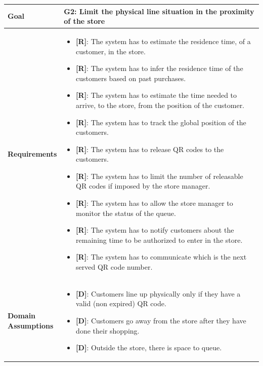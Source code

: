 \begin{table}[H]
\centering
\begin{tabular}{| m{} | m{} |} 
	\hline
	\textbf{Goal} &
		\textbf{G2: Limit the physical line situation in the proximity of the store} \\
	\hline
	\textbf{Requirements} &
		\begin{itemize}
			\item {\textbf{[R]}}: The system has to estimate the residence time, of a customer, in the store.
			\item {\textbf{[R]}}: The system has to infer the residence time of the customers based on past purchases.
			\item {\textbf{[R]}}: The system has to estimate the time needed to arrive, to the store, from the position of the customer.
			\item {\textbf{[R]}}: The system has to track the global position of the customers.
			\item {\textbf{[R]}}: The system has to release QR codes to the customers.
			\item {\textbf{[R]}}: The system has to limit the number of releasable QR codes if imposed by the store manager.
			\item {\textbf{[R]}}: The system has to allow the store manager to monitor the status of the queue.
			\item {\textbf{[R]}}: The system has to notify customers about the remaining time to be authorized to enter in the store.
			\item {\textbf{[R]}}: The system has to communicate which is the next served QR code number.
		\end{itemize} \\ 
	\hline
	\shortstack[l]{\textbf{Domain} \\ \textbf{Assumptions}} & 
		\begin{itemize}
			\item {\textbf{[D]}}: Customers line up physically only if they have a valid (non expired) QR code.
			\item {\textbf{[D]}}: Customers go away from the store after they have done their shopping.
			\item {\textbf{[D]}}: Outside the store, there is space to queue.
		\end{itemize} \\ 
	\hline
\end{tabular}
\end{table}

